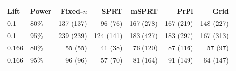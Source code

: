 \begin{tabular}{llrrrrr}
\toprule
Lift & Power & Fixed-$n$ & SPRT & mSPRT & PrPl & Grid \\
\midrule
0.1 & 80\% & 137 (137) & 96 (76) & 167 (278) & 167 (219) & 148 (227) \\
0.1 & 95\% & 239 (239) & 124 (141) & 183 (427) & 183 (297) & 167 (313) \\
0.166 & 80\% & 55 (55) & 41 (38) & 76 (120) & 87 (116) & 57 (97) \\
0.166 & 95\% & 96 (96) & 57 (70) & 81 (164) & 91 (149) & 64 (147) \\
\bottomrule
\end{tabular}
